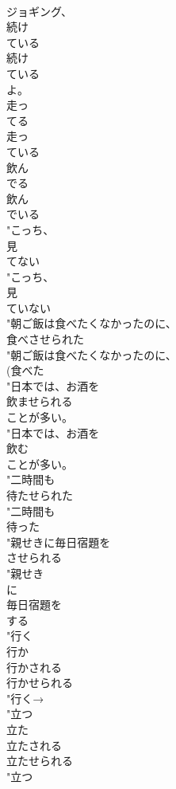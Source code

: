 \documentclass[8pt]{extreport}
\begin{document}
\begin{CJK}{UTF8}{min}
\\	ジョギング、
\\	続け
\\	ている
\\	続け
\\	ている
\\	よ。
\\	走っ
\\	てる
\\	走っ
\\	ている
\\	飲ん
\\	でる
\\	飲ん
\\	でいる
\\	"こっち、
\\	見
\\	てない
\\	"こっち、
\\	見
\\	ていない
\\	"朝ご飯は食べたくなかったのに、
\\	食べさせられた
\\	"朝ご飯は食べたくなかったのに、
\\	(食べた
\\	"日本では、お酒を
\\	飲ませられる
\\	ことが多い。
\\	"日本では、お酒を
\\	飲む
\\	ことが多い。
\\	"二時間も
\\	待たせられた
\\	"二時間も
\\	待った
\\	"親せきに毎日宿題を
\\	させられる
\\	"親せき
\\	に
\\	毎日宿題を
\\	する
\\	"行く 
\\	行か 
\\	行かされる
\\	行かせられる
\\	"行く→ 
\\	"立つ 
\\	立た 
\\	立たされる
\\	立たせられる
\\	"立つ 

\end{CJK}
\end{document}
